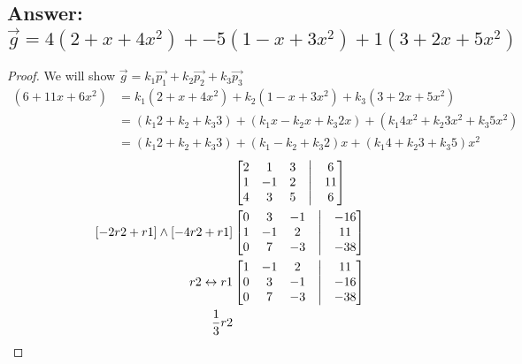 \documentclass[11pt]{article}
\begin{document}
\subsection{Answer: $\vec{g} =  4(2 + x + 4x^2) +  -5(1 - x + 3x^2) +  1(3 + 2x + 5x^2)$}
\begin{proof} We will show $\vec{g} = k_{1}\vec{p_{1}} + k_{2}\vec{p_{2}} + k_{3}\vec{p_{3}}$
        \begin{align*}
                (6 + 11x + 6x^2) & =  k_{1}(2 + x + 4x^2) +  k_{2}(1 - x + 3x^2) +  k_{3}(3 + 2x + 5x^2)                                \\
                                 & =  (k_{1}2 + k_{2} + k_{3}3)  +  (k_{1}x - k_{2}x + k_{3}2x)  +  (k_{1}4x^2 + k_{2}3x^2 + k_{3}5x^2) \\
                                 & =  (k_{1}2 + k_{2} + k_{3}3)  +  (k_{1} - k_{2} + k_{3}2)x    +  (k_{1}4 + k_{2}3 + k_{3}5)x^2
        \end{align*}
        \begin{align*}
                 &
                \begin{bmatrix}
                        2 & 1  & 3 & \bigm| & 6  \\
                        1 & -1 & 2 & \bigm| & 11 \\
                        4 & 3  & 5 & \bigm| & 6  \\
                \end{bmatrix} \\
                [-2r2+r1] \wedge [-4r2+r1]
                 &
                \begin{bmatrix}
                        0 & 3  & -1 & \bigm| & -16 \\
                        1 & -1 & 2  & \bigm| & 11  \\
                        0 & 7  & -3 & \bigm| & -38 \\
                \end{bmatrix} \\
                r2\leftrightarrow r1
                 &
                \begin{bmatrix}
                        1 & -1 & 2  & \bigm| & 11  \\
                        0 & 3  & -1 & \bigm| & -16 \\
                        0 & 7  & -3 & \bigm| & -38 \\
                \end{bmatrix} \\
                \frac{1}{3}r2

\end{align*}
\end{proof}
\end{document}
